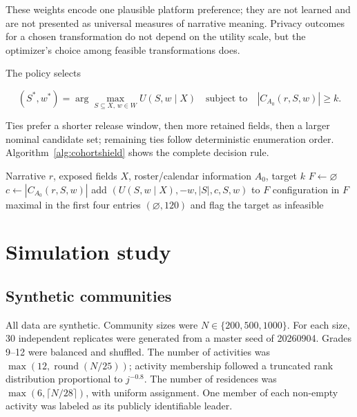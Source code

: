 \documentclass[pdflatex,sn-mathphys-num]{sn-jnl}
\theoremstyle{plain}
\begin{document}
These weights encode one plausible platform preference; they are not learned and are not presented as universal measures of narrative meaning. Privacy outcomes for a chosen transformation do not depend on the utility scale, but the optimizer's choice among feasible transformations does.

The policy selects

\begin{equation}
(S^*,w^*)=\arg\max_{S\subseteq X,\,w\in W}U(S,w\mid X)
\quad\text{subject to}\quad |C_{A_0}(r,S,w)|\geq k.
\label{eq:optimization}
\end{equation}

Ties prefer a shorter release window, then more retained fields, then a larger nominal candidate set; remaining ties follow deterministic enumeration order. Algorithm~\ref{alg:cohortshield} shows the complete decision rule.

\begin{algorithm}[t]
\caption{CohortShield release selection}\label{alg:cohortshield}
\begin{algorithmic}[1]
\Require Narrative $r$, exposed fields $X$, roster/calendar information $A_0$, target $k$
\State $F\gets\varnothing$
    \State $c\gets|C_{A_0}(r,S,w)|$
      \State add $(U(S,w\mid X),-w,|S|,c,S,w)$ to $F$
    \EndIf
  \EndFor
\EndFor
{}
  \State \Return configuration in $F$ maximal in the first four entries
\Else
  \State \Return $(\varnothing,120)$ and flag the target as infeasible
\EndIf
\end{algorithmic}
\end{algorithm}

\section{Simulation study}\label{sec:simulation}

\subsection{Synthetic communities}

All data are synthetic. Community sizes were $N\in\{200,500,1000\}$. For each size, 30 independent replicates were generated from a master seed of 20260904. Grades 9--12 were balanced and shuffled. The number of activities was $\max(12,\operatorname{round}(N/25))$; activity membership followed a truncated rank distribution proportional to $j^{-0.8}$. The number of residences was $\max(6,\lceil N/28\rceil)$, with uniform assignment. One member of each non-empty activity was labeled as its publicly identifiable leader.
\end{document}
